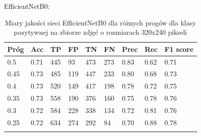 \documentclass[polish,12pt]{aghthesis}
\begin{document}
\par\noindent EfficientNetB0:
 \begin{longtable}[h!]{|m{2.0cm}|m{1.2cm}|m{1.2cm}|m{1.2cm}|m{1.2cm}|m{1.2cm}|m{1.2cm}|m{1.2cm}|m{1.6cm}|}
 \hline
 Próg & Acc & TP & FP & TN & FN & Prec & Rec & F1 score\\
 \hline
 0.5 & 0.71 & 445 & 93 & 473 & 273 & 0.83 & 0.62 & 0.71\\
 \hline
 0.45 & 0.73 & 485 & 119 & 447 & 233 & 0.80 & 0.68 & 0.73\\
 \hline
 0.4 & 0.73 & 520 & 149 & 417 & 198 & 0.78 & 0.72 & 0.75\\
 \hline
 0.35 & 0.73 & 558 & 190 & 376 & 160 & 0.75 & 0.78 & 0.76 \\
 \hline
 0.3 & 0.72 & 584 & 228 & 338 & 134 & 0.72 & 0.81 & 0.76\\
 \hline
 0.25 & 0.72 & 634 & 274 & 292 & 84 & 0.70 & 0.88 & 0.78\\
 \hline
\caption{Miary jakości sieci EfficientNetB0 dla różnych progów dla klasy pozytywnej na zbiorze zdjęć o rozmiarach 320x240 pikseli}
\end{longtable}
\end{document}
